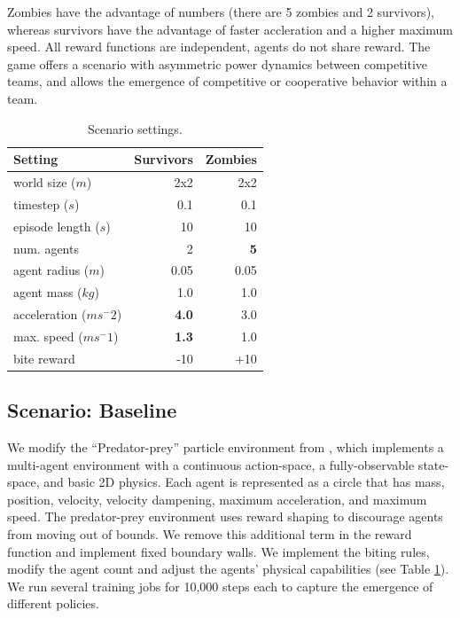 \documentclass[11pt,a4paper]{article}
\begin{document}
Zombies have the advantage of numbers (there are 5 zombies and 2 survivors), whereas survivors have the advantage of faster accleration and a higher maximum speed.
All reward functions are independent, agents do not share reward.
The game offers a scenario with asymmetric power dynamics between competitive teams, and allows the emergence of competitive or cooperative behavior within a team.

\begin{table}
\centering
\begin{tabular}{lrr}
\hline \textbf{Setting} & \textbf{Survivors} & \textbf{Zombies} \\ \hline
  world size ($m$) & 2x2 & 2x2 \\
  timestep ($s$) & 0.1 & 0.1 \\
  episode length ($s$) & 10 & 10 \\
  num. agents & 2 & \textbf{5} \\
  agent radius ($m$) & 0.05 & 0.05 \\
  agent mass ($kg$) & 1.0 & 1.0 \\
  acceleration ($ms^-2$) & \textbf{4.0} & 3.0 \\
  max. speed ($ms^-1$) & \textbf{1.3} & 1.0 \\
  bite reward & -10 & +10 \\
\hline
\end{tabular}
\caption{\label{game-settings} Scenario settings. }
\end{table}

\subsection{Scenario: Baseline}
\label{sec:baseline}

We modify the ``Predator-prey'' particle environment from \citealp{lowe2020multiagent}, which implements a multi-agent environment with a continuous action-space, a fully-observable state-space, and basic 2D physics.
Each agent is represented as a circle that has mass, position, velocity, velocity dampening, maximum acceleration, and maximum speed.
The predator-prey environment uses reward shaping to discourage agents from moving out of bounds.
We remove this additional term in the reward function and implement fixed boundary walls.
We implement the biting rules, modify the agent count and adjust the agents' physical capabilities (see Table \ref{game-settings}).
We run several training jobs for 10,000 steps each to capture the emergence of different policies.
\end{document}
